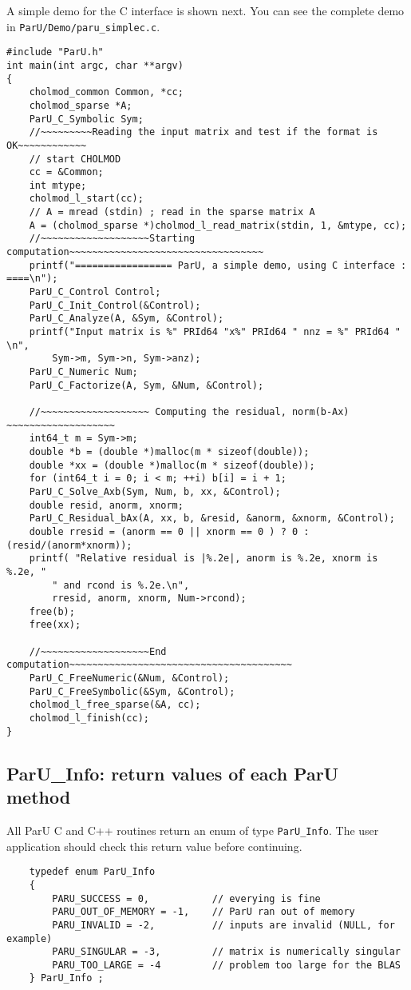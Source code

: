 \documentclass[12pt]{article}
\begin{document}
A simple demo for the C interface is shown next. You can see the complete demo
in \verb'ParU/Demo/paru_simplec.c'.

\begin{verbatim}
#include "ParU.h"
int main(int argc, char **argv)
{
    cholmod_common Common, *cc;
    cholmod_sparse *A;
    ParU_C_Symbolic Sym;
    //~~~~~~~~~Reading the input matrix and test if the format is OK~~~~~~~~~~~~
    // start CHOLMOD
    cc = &Common;
    int mtype;
    cholmod_l_start(cc);
    // A = mread (stdin) ; read in the sparse matrix A
    A = (cholmod_sparse *)cholmod_l_read_matrix(stdin, 1, &mtype, cc);
    //~~~~~~~~~~~~~~~~~~~Starting computation~~~~~~~~~~~~~~~~~~~~~~~~~~~~~~~~~~
    printf("================= ParU, a simple demo, using C interface : ====\n");
    ParU_C_Control Control;
    ParU_C_Init_Control(&Control);
    ParU_C_Analyze(A, &Sym, &Control);
    printf("Input matrix is %" PRId64 "x%" PRId64 " nnz = %" PRId64 " \n",
        Sym->m, Sym->n, Sym->anz);
    ParU_C_Numeric Num;
    ParU_C_Factorize(A, Sym, &Num, &Control);

    //~~~~~~~~~~~~~~~~~~~ Computing the residual, norm(b-Ax) ~~~~~~~~~~~~~~~~~~~
    int64_t m = Sym->m;
    double *b = (double *)malloc(m * sizeof(double));
    double *xx = (double *)malloc(m * sizeof(double));
    for (int64_t i = 0; i < m; ++i) b[i] = i + 1;
    ParU_C_Solve_Axb(Sym, Num, b, xx, &Control);
    double resid, anorm, xnorm;
    ParU_C_Residual_bAx(A, xx, b, &resid, &anorm, &xnorm, &Control);
    double rresid = (anorm == 0 || xnorm == 0 ) ? 0 : (resid/(anorm*xnorm));
    printf( "Relative residual is |%.2e|, anorm is %.2e, xnorm is %.2e, "
        " and rcond is %.2e.\n",
        rresid, anorm, xnorm, Num->rcond);
    free(b);
    free(xx);

    //~~~~~~~~~~~~~~~~~~~End computation~~~~~~~~~~~~~~~~~~~~~~~~~~~~~~~~~~~~~~~
    ParU_C_FreeNumeric(&Num, &Control);
    ParU_C_FreeSymbolic(&Sym, &Control);
    cholmod_l_free_sparse(&A, cc);
    cholmod_l_finish(cc);
}
\end{verbatim}

\subsection{{\sf ParU\_Info}: return values of each ParU method}

    All ParU C and C++ routines return an enum of type \verb'ParU_Info'.  The
    user application should check this return value before continuing.

    {\footnotesize
    \begin{verbatim}
    typedef enum ParU_Info
    {
        PARU_SUCCESS = 0,           // everying is fine
        PARU_OUT_OF_MEMORY = -1,    // ParU ran out of memory
        PARU_INVALID = -2,          // inputs are invalid (NULL, for example)
        PARU_SINGULAR = -3,         // matrix is numerically singular
        PARU_TOO_LARGE = -4         // problem too large for the BLAS
    } ParU_Info ; \end{verbatim}}
\end{document}

